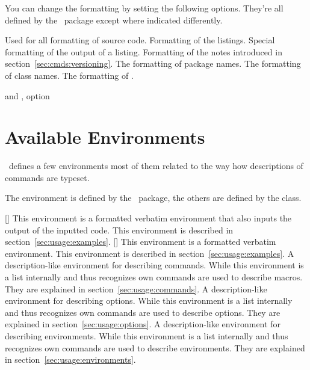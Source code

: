 \documentclass[load-preamble]{cnltx-doc}
\makeatletter
\def\cnltx{\cnltx@package@name@format{cnltx}}
\makeatother
\begin{document}
You can change the formatting by setting the following options.  They're all
defined by the \cnltx\ package except where indicated differently.

\begin{options}
    Used for all formatting of source code.
    Formatting of the listings.
  \Default
    Special formatting of the output of a listing.
    \byclass Formatting of the notes introduced in
    section~\ref{sec:cmds:versioning}.
    The formatting of package names.
    The formatting of class names.
    The formatting of .
\end{options}

\begin{example}
   and , option 
\end{example}

\section{Available Environments}\label{sec:envs}

\cnltx\ defines a few environments most of them related to the way how
descriptions of commands are typeset.

The  environment is defined by the \cnltx\ package, the
others are defined by the class.

\begin{environments}
  []
    This environment is a formatted verbatim environment that also inputs the
    output of the inputted code.  This environment is described in
    section~\ref{sec:usage:examples}.
  []
    This environment is a formatted verbatim environment.  This environment is
    described in section~\ref{sec:usage:examples}.
    A description-like environment for describing commands.  While this
    environment is a list internally and thus recognizes  own
    commands are used to describe macros.  They are explained in
    section~\ref{sec:usage:commands}.
    A description-like environment for describing options.  While this
    environment is a list internally and thus recognizes  own
    commands are used to describe options.  They are explained in
    section~\ref{sec:usage:options}.
    A description-like environment for describing environments.  While this
    environment is a list internally and thus recognizes  own
    commands are used to describe environments.  They are explained in
    section~\ref{sec:usage:environments}.
\end{environments}
\end{document}
